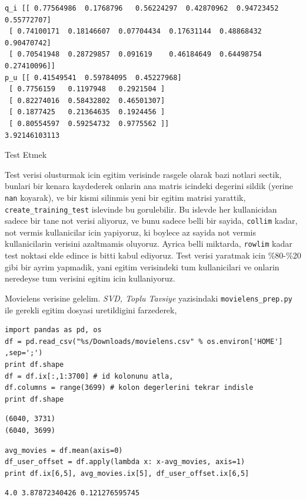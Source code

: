 \documentclass[12pt,fleqn]{article}\usepackage{../common}
\begin{document}
\begin{verbatim}
q_i [[ 0.77564986  0.1768796   0.56224297  0.42870962  0.94723452  0.55772707]
 [ 0.74100171  0.18146607  0.07704434  0.17631144  0.48868432  0.90470742]
 [ 0.70541948  0.28729857  0.091619    0.46184649  0.64498754  0.27410096]]
p_u [[ 0.41549541  0.59784095  0.45227968]
 [ 0.7756159   0.1197948   0.2921504 ]
 [ 0.82274016  0.58432802  0.46501307]
 [ 0.1877425   0.21364635  0.1924456 ]
 [ 0.80554597  0.59254732  0.9775562 ]]
3.92146103113
\end{verbatim}

Test Etmek

Test verisi olusturmak icin egitim verisinde rasgele olarak bazi notlari
sectik, bunlari bir kenara kaydederek onlarin ana matris icindeki degerini
sildik (yerine \verb!nan!  koyarak), ve bir kismi silinmis yeni bir egitim
matrisi yarattik, \verb!create_training_test! islevinde bu gorulebilir. Bu
islevde her kullanicidan sadece bir tane not verisi aliyoruz, ve bunu
sadece belli bir sayida, \verb!collim! kadar, not vermis kullanicilar icin
yapiyoruz, ki boylece az sayida not vermis kullanicilarin verisini azaltmamis
oluyoruz. Ayrica belli miktarda, \verb!rowlim! kadar test noktasi elde
edince is bitti kabul ediyoruz. Test verisi yaratmak icin \%80-\%20 gibi
bir ayrim yapmadik, yani egitim verisindeki tum kullanicilari ve onlarin
neredeyse tum verisini egitim icin kullaniyoruz.

Movielens verisine gelelim. {\em SVD, Toplu Tavsiye} yazisindaki
\verb!movielens_prep.py! ile gerekli egitim dosyasi uretildigini
farzederek,

\begin{verbatim}
import pandas as pd, os
df = pd.read_csv("%s/Downloads/movielens.csv" % os.environ['HOME'] ,sep=';')
print df.shape
df = df.ix[:,1:3700] # id kolonunu atla,
df.columns = range(3699) # kolon degerlerini tekrar indisle
print df.shape
\end{verbatim}

\begin{verbatim}
(6040, 3731)
(6040, 3699)
\end{verbatim}

\begin{verbatim}
avg_movies = df.mean(axis=0)
df_user_offset = df.apply(lambda x: x-avg_movies, axis=1)
print df.ix[6,5], avg_movies.ix[5], df_user_offset.ix[6,5]
\end{verbatim}

\begin{verbatim}
4.0 3.87872340426 0.121276595745
\end{verbatim}
\end{document}
